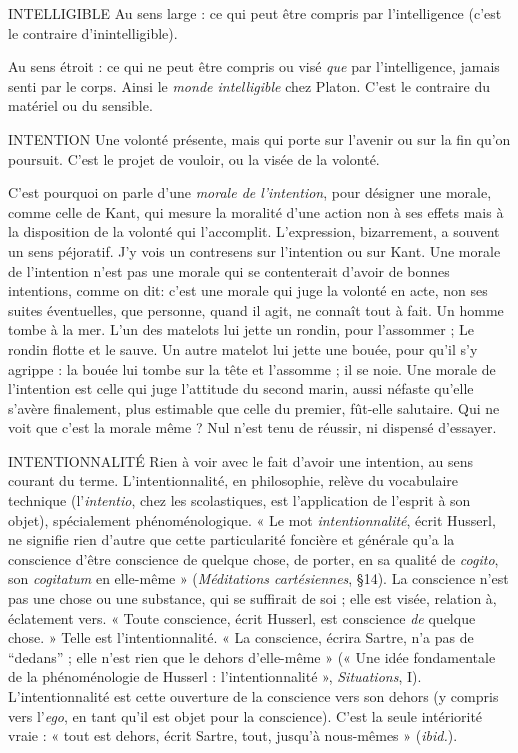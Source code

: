 INTELLIGIBLE Au sens large : ce qui peut être compris par l'intelligence
(c’est le contraire d’inintelligible).

Au sens étroit : ce qui ne peut être compris ou visé {\it que} par l’intelligence,
jamais senti par le corps. Ainsi le {\it monde intelligible} chez Platon. C’est le
contraire du matériel ou du sensible.

INTENTION Une volonté présente, mais qui porte sur l’avenir ou sur la fin
qu’on poursuit. C’est le projet de vouloir, ou la visée de la
volonté.

C’est pourquoi on parle d’une {\it morale de l'intention}, pour désigner une
morale, comme celle de Kant, qui mesure la moralité d’une action non à ses
effets mais à la disposition de la volonté qui l’accomplit. L'expression, bizarrement,
a souvent un sens péjoratif. J'y vois un contresens sur l’intention ou sur
Kant. Une morale de l'intention n’est pas une morale qui se contenterait
d’avoir de bonnes intentions, comme on dit: c’est une morale qui juge la
volonté en acte, non ses suites éventuelles, que personne, quand il agit, ne
connaît tout à fait. Un homme tombe à la mer. L'un des matelots lui jette un
rondin, pour l’assommer ; Le rondin flotte et le sauve. Un autre matelot lui jette
une bouée, pour qu’il s’y agrippe : la bouée lui tombe sur la tête et l’assomme ;
il se noie. Une morale de l'intention est celle qui juge l'attitude du second
marin, aussi néfaste qu’elle s’avère finalement, plus estimable que celle du
premier, fût-elle salutaire. Qui ne voit que c’est la morale même ? Nul n’est
tenu de réussir, ni dispensé d’essayer.

INTENTIONNALITÉ Rien à voir avec le fait d’avoir une intention, au sens
courant du terme. L’intentionnalité, en philosophie,
relève du vocabulaire technique (l’{\it intentio}, chez les scolastiques, est l’application
de l'esprit à son objet), spécialement phénoménologique. « Le mot {\it intentionnalité},
écrit Husserl, ne signifie rien d’autre que cette particularité foncière
et générale qu’a la conscience d’être conscience de quelque chose, de porter, en
sa qualité de {\it cogito}, son {\it cogitatum} en elle-même » ({\it Méditations cartésiennes},
\S 14). La conscience n’est pas une chose ou une substance, qui se suffirait de
soi ; elle est visée, relation à, éclatement vers. « Toute conscience, écrit Husserl,
est conscience {\it de} quelque chose. » Telle est l’intentionnalité. « La conscience,
écrira Sartre, n’a pas de “dedans” ; elle n’est rien que le dehors d’elle-même »
(« Une idée fondamentale de la phénoménologie de Husserl : l’intentionnalité »,
{\it Situations}, I). L’intentionnalité est cette ouverture de la conscience vers
son dehors (y compris vers l’{\it ego}, en tant qu’il est objet pour la conscience).
C’est la seule intériorité vraie : « tout est dehors, écrit Sartre, tout, jusqu’à
nous-mêmes » ({\it ibid.}).

